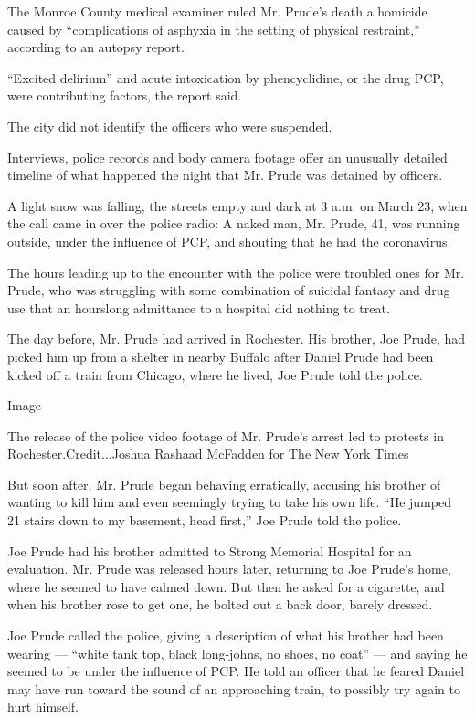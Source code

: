 The Monroe County medical examiner ruled Mr. Prude's death a homicide
caused by ``complications of asphyxia in the setting of physical
restraint,'' according to an autopsy report.

``Excited delirium'' and acute intoxication by phencyclidine, or the
drug PCP, were contributing factors, the report said.

The city did not identify the officers who were suspended.

Interviews, police records and body camera footage offer an unusually
detailed timeline of what happened the night that Mr. Prude was detained
by officers.

A light snow was falling, the streets empty and dark at 3 a.m. on March
23, when the call came in over the police radio: A naked man, Mr. Prude,
41, was running outside, under the influence of PCP, and shouting that
he had the coronavirus.

The hours leading up to the encounter with the police were troubled ones
for Mr. Prude, who was struggling with some combination of suicidal
fantasy and drug use that an hourslong admittance to a hospital did
nothing to treat.

The day before, Mr. Prude had arrived in Rochester. His brother, Joe
Prude, had picked him up from a shelter in nearby Buffalo after Daniel
Prude had been kicked off a train from Chicago, where he lived, Joe
Prude told the police.

Image

The release of the police video footage of Mr. Prude's arrest led to
protests in Rochester.Credit...Joshua Rashaad McFadden for The New York
Times

But soon after, Mr. Prude began behaving erratically, accusing his
brother of wanting to kill him and even seemingly trying to take his own
life. ``He jumped 21 stairs down to my basement, head first,'' Joe Prude
told the police.

Joe Prude had his brother admitted to Strong Memorial Hospital for an
evaluation. Mr. Prude was released hours later, returning to Joe Prude's
home, where he seemed to have calmed down. But then he asked for a
cigarette, and when his brother rose to get one, he bolted out a back
door, barely dressed.

Joe Prude called the police, giving a description of what his brother
had been wearing --- ``white tank top, black long-johns, no shoes, no
coat'' --- and saying he seemed to be under the influence of PCP. He
told an officer that he feared Daniel may have run toward the sound of
an approaching train, to possibly try again to hurt himself.

